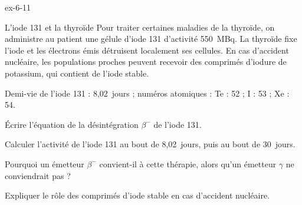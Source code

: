\begin{blocLivre}{ex-6-11}
\begin{exercice}[2]{L'iode 131 et la thyroïde}
Pour traiter certaines maladies de la thyroïde, on administre au patient une gélule d'iode 131 d'activité 550~MBq.
La thyroïde fixe l'iode et les électrons émis détruisent localement ses cellules. En cas d'accident nucléaire, les
populations proches peuvent recevoir des comprimés d'iodure de potassium, qui contient de l'iode stable.
\begin{donnees}
Demi-vie de l'iode 131 : 8,02~jours ; numéros atomiques : Te : 52 ; I : 53 ; Xe : 54.
\end{donnees}
\begin{questions}
\item Écrire l'équation de la désintégration $\beta^-$ de l'iode 131.
\item Calculer l'activité de l'iode 131 au bout de 8,02~jours, puis au bout de 30~jours.
\item Pourquoi un émetteur $\beta^-$ convient-il à cette thérapie, alors qu'un émetteur $\gamma$ ne conviendrait pas ?
\item Expliquer le rôle des comprimés d'iode stable en cas d'accident nucléaire.
\end{questions}
\end{exercice}
\end{blocLivre}

